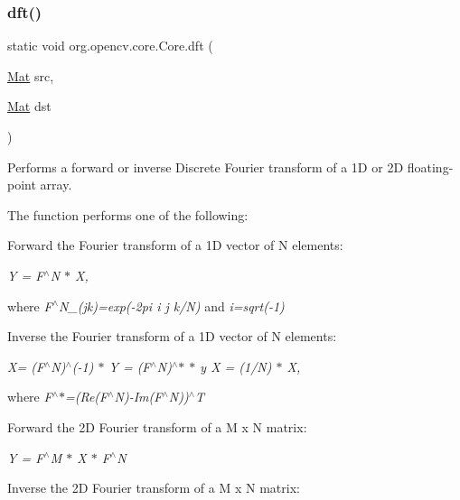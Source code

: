 \subsubsection{\texorpdfstring{dft()}{dft()}\hspace{0.1cm}{\footnotesize\ttfamily [2/2]}}
{\footnotesize\ttfamily static void org.\+opencv.\+core.\+Core.\+dft (\begin{DoxyParamCaption}\item[{\mbox{\hyperlink{classorg_1_1opencv_1_1core_1_1_mat}{Mat}}}]{src,  }\item[{\mbox{\hyperlink{classorg_1_1opencv_1_1core_1_1_mat}{Mat}}}]{dst }\end{DoxyParamCaption})\hspace{0.3cm}{\ttfamily [static]}}

Performs a forward or inverse Discrete Fourier transform of a 1D or 2D floating-\/point array.

The function performs one of the following\+:


\begin{DoxyItemize}
\item Forward the Fourier transform of a 1D vector of {\ttfamily N} elements\+: 
\end{DoxyItemize}

{\itshape Y = F$^\wedge$N $\ast$ X,}

where {\itshape F$^\wedge$\+N\+\_\+(jk)=exp(-\/2pi i j k/N)} and {\itshape i=sqrt(-\/1)}


\begin{DoxyItemize}
\item Inverse the Fourier transform of a 1D vector of {\ttfamily N} elements\+: 
\end{DoxyItemize}

{\itshape X\textquotesingle{}= (F$^\wedge$N)$^\wedge$(-\/1) $\ast$ Y = (F$^\wedge$N)$^\wedge$$\ast$ $\ast$ y X = (1/N) $\ast$ X, }

where {\itshape F$^\wedge$$\ast$=(Re(\+F$^\wedge$\+N)-\/\+Im(F$^\wedge$N))$^\wedge$T}


\begin{DoxyItemize}
\item Forward the 2D Fourier transform of a {\ttfamily M x N} matrix\+: 
\end{DoxyItemize}

{\itshape Y = F$^\wedge$M $\ast$ X $\ast$ F$^\wedge$N}


\begin{DoxyItemize}
\item Inverse the 2D Fourier transform of a {\ttfamily M x N} matrix\+: 
\end{DoxyItemize}

